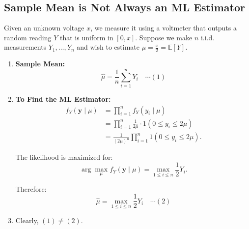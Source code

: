 \subsection{Sample Mean is Not Always an ML Estimator}
\begin{example}
    Given an unknown voltage \( x \), we measure it using a voltmeter that outputs a random reading \( Y \) that is uniform in \( [0, x] \). Suppose we make \( n \) i.i.d. measurements \( Y_1, \dots, Y_n \) and wish to estimate \( \mu = \frac{x}{2} = \mathbb{E}[Y] \).
    \begin{enumerate}
        \item \textbf{Sample Mean:} 
        \[
        \hat{\mu} = \frac{1}{n} \sum_{i=1}^n Y_i \quad \cdots (1)
        \]

        \item \textbf{To Find the ML Estimator:}
        \begin{align*}
            f_Y(\mathbf{y} \mid \mu) &= \prod_{i=1}^n f_Y(y_i \mid \mu) \\
            &= \prod_{i=1}^n \frac{1}{2\mu} \cdot 1(0 \leq y_i \leq 2\mu) \\
            &= \frac{1}{(2\mu)^n} \prod_{i=1}^n 1(0 \leq y_i \leq 2\mu).
        \end{align*}
        
        The likelihood is maximized for:
        \[
        \arg\max_{\mu} f_Y(\mathbf{y} \mid \mu) = \max_{1 \leq i \leq n} \frac{1}{2} Y_i.
        \]

        Therefore:
        \[
        \hat{\mu} = \max_{1 \leq i \leq n} \frac{1}{2} Y_i \quad \cdots (2)
        \]

        \item Clearly, \( (1) \neq (2) \).
    \end{enumerate}
\end{example}



